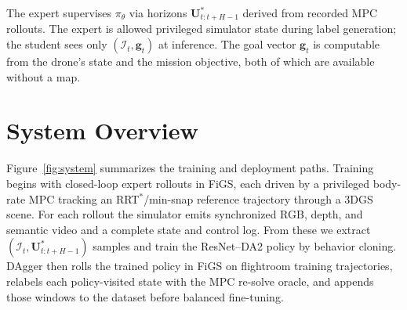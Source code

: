 \documentclass[10pt,twocolumn,letterpaper]{article}
\begin{document}
The expert supervises $\pi_\theta$ via horizons $\mathbf{U}^{*}_{t:t+H-1}$ derived from recorded MPC rollouts. The expert is allowed privileged simulator state during label generation; the student sees only $(\mathcal{I}_t, \mathbf{g}_t)$ at inference. The goal vector $\mathbf{g}_t$ is computable from the drone's state and the mission objective, both of which are available without a map.

\section{System Overview}
\label{sec:overview}

Figure~\ref{fig:system} summarizes the training and deployment paths. Training begins with closed-loop expert rollouts in FiGS, each driven by a privileged body-rate MPC tracking an RRT$^{*}$/min-snap reference trajectory through a 3DGS scene. For each rollout the simulator emits synchronized RGB, depth, and semantic video and a complete state and control log. From these we extract $(\mathcal{I}_t, \mathbf{U}^{*}_{t:t+H-1})$ samples and train the ResNet--DA2 policy by behavior cloning. DAgger then rolls the trained policy in FiGS on flightroom training trajectories, relabels each policy-visited state with the MPC re-solve oracle, and appends those windows to the dataset before balanced fine-tuning.
\end{document}
